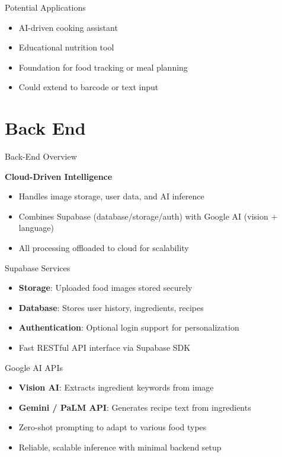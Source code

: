 \documentclass{beamer}
\begin{document}
\begin{frame}{Potential Applications}
    \begin{itemize}
        \item AI-driven cooking assistant
        \item Educational nutrition tool
        \item Foundation for food tracking or meal planning
        \item Could extend to barcode or text input
    \end{itemize}
\end{frame}

\section{Back End}

\begin{frame}{Back-End Overview}
    \begin{block}{\textbf{Cloud-Driven Intelligence}}
        \begin{itemize}
            \item Handles image storage, user data, and AI inference
            \item Combines Supabase (database/storage/auth) with Google AI (vision + language)
            \item All processing offloaded to cloud for scalability
        \end{itemize}
    \end{block}
\end{frame}

\begin{frame}{Supabase Services}
    \begin{itemize}
        \item \textbf{Storage}: Uploaded food images stored securely
        \item \textbf{Database}: Stores user history, ingredients, recipes
        \item \textbf{Authentication}: Optional login support for personalization
        \item Fast RESTful API interface via Supabase SDK
    \end{itemize}
\end{frame}

\begin{frame}{Google AI APIs}
    \begin{itemize}
        \item \textbf{Vision AI}: Extracts ingredient keywords from image
        \item \textbf{Gemini / PaLM API}: Generates recipe text from ingredients
        \item Zero-shot prompting to adapt to various food types
        \item Reliable, scalable inference with minimal backend setup
    \end{itemize}
\end{frame}
\end{document}
